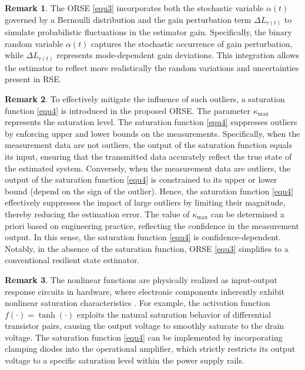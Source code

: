 \documentclass[preprint,review,fleqn,sort&compress,3p]{elsarticle}
\theoremstyle{definition}%
\newtheorem{rem}{Remark}[section]
\begin{document}
	\begin{rem}\label{rem3}
		 The ORSE \eqref{equ3} incorporates both the stochastic variable $\alpha(t)$ governed by a Bernoulli distribution and the gain perturbation term $\Delta L_{r(t)}$ to simulate probabilistic fluctuations in the estimator gain. Specifically, the binary random variable $\alpha(t)$ captures the stochastic occurrence of gain perturbation, while $\Delta L_{r(t)}$ represents mode-dependent gain deviations. This integration allows the estimator to reflect more realistically the random variations and uncertainties present in RSE.
	\end{rem}
	\begin{rem}\label{rem4}
		To effectively mitigate the influence of such outliers, a saturation function \eqref{equ4} is introduced in the proposed ORSE. The parameter $\kappa_{\text{max}}$ represents the saturation level. The saturation function \eqref{equ4} suppresses outliers by enforcing upper and lower bounds on the measurements. {\color{red}Specifically, when the measurement data are not outliers, the output of the saturation function equals its input, ensuring that the transmitted data accurately reflect the true state of the estimated system. Conversely, when the measurement data are outliers, the output of the saturation function \eqref{equ4} is constrained to its upper or lower bound (depend on the sign of the outlier). Hence, the saturation function \eqref{equ4} effectively suppresses the impact of large outliers by limiting their magnitude, thereby reducing the estimation error.} The value of $\kappa_{\text{max}}$ can be determined a priori based on engineering practice, reflecting the confidence in the measurement output. In this sense, the saturation function \eqref{equ4} is confidence-dependent. Notably, in the absence of the saturation function, ORSE \eqref{equ3} simplifies to a conventional resilient state estimator.
	\end{rem}
	\begin{rem}\label{rem2.5}
		{\color{red}The nonlinear functions are physically realized as input-output response circuits in hardware, where electronic components inherently exhibit nonlinear saturation characteristics \cite{yang2019design}. For example, the activation function $f(\cdot)=\tanh(\cdot)$ exploits the natural saturation behavior of differential transistor pairs, causing the output voltage to smoothly saturate to the drain voltage. The saturation function \eqref{equ4} can be implemented by incorporating clamping diodes into the operational amplifier, which strictly restricts its output voltage to a specific saturation level within the power supply rails.}
	\end{rem}
\end{document}

